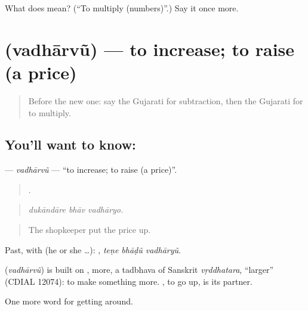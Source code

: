 \begin{tcolorbox}[breakable,colback=teal!4,colframe=teal!35!black,title={Before you move on}]
What does  mean? (\textquotedblleft{}To multiply (numbers)\textquotedblright{}.) Say it once more.
\end{tcolorbox}
\section[\texorpdfstring{\gu{વધારવું} (vadhārvũ)}{વધારવું (vadhārvũ)}]{ (vadhārvũ) — to increase; to raise (a price)}

\label{lesson:GU-C426-vadharvu}



\begin{quote}
Before the new one: say the Gujarati for subtraction, then the Gujarati for to multiply.
\end{quote}

\subsection*{You'll want to know: }
\textbf{} — \emph{vadhārvũ} — \textquotedblleft{}to increase; to raise (a price)\textquotedblright{}.

\begin{quote}
  .
\end{quote}

\begin{quote}
\emph{dukāndāre bhāv vadhāryo.}
\end{quote}

\begin{quote}
The shopkeeper put the price up.
\end{quote}

Past, with  (he or she …):   , \emph{teṇe bhāḍũ vadhāryũ}.

\begin{cousinweb}
\textbf{} (\emph{vadhārvũ}) is built on , more, a tadbhava of Sanskrit \emph{vṛddhatara}, \textquotedblleft{}larger\textquotedblright{} (CDIAL 12074): to make something more. , to go up, is its partner.
\end{cousinweb}

\begin{grammarlens}[title={What you've built}]
One more word for getting around.
\end{grammarlens}

